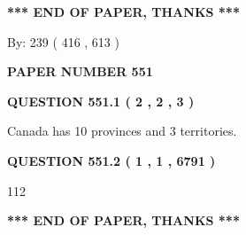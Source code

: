\documentclass[12pt]{article}
\begin{document}
   
   
   
   
\vspace{1.0in} 
{\textbf{\large{ *** END OF PAPER, THANKS *** }}} 
   
   
\hspace{1.0in} By: 
 239 ( 416 ,  613 )
   
   
   
   
\newpage 
\setcounter{page}{ 
   551001 } 
   
   
   
   
 {\textbf{ \Large{ PAPER NUMBER  551  }}}
   
   
\vspace{0.2in}
   
   
   
   
   
   
 \vspace{0.2in}
 
 
 
 
   
   
  
\vspace{0.2in}
  
{\textbf{\Large{QUESTION
551.1 
 ( 2 , 2 , 3 )
}}}
  
  
 
 
\noindent{}
 
 
Canada has 10  provinces and 3 territories.
 
 
 
 
  
\vspace{0.2in}
  
{\textbf{\Large{QUESTION
551.2 
 ( 1 , 1 , 6791 )
}}}
  
  
 
 
\noindent{}

112
 
 
   
   
 \vspace{0.2in}
 
   
   
   
   
\vspace{1.0in} 
{\textbf{\large{ *** END OF PAPER, THANKS *** }}} 
   
\end{document}
